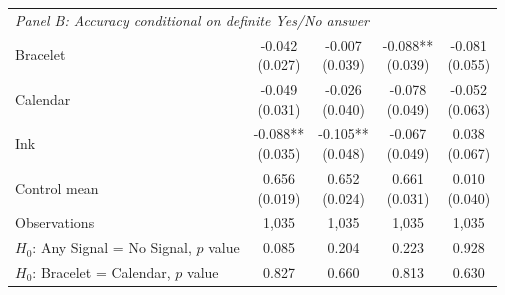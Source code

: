 {\begin{tabular}[t]{lcccc}
\multicolumn{5}{l}{\textit{Panel B: Accuracy conditional on definite Yes/No answer}} \\
Bracelet & \makecell[c]{-0.042\\{(0.027)}} & \makecell[c]{-0.007\\{(0.039)}} & \makecell[c]{-0.088**\\{(0.039)}} & \makecell[c]{-0.081\\{(0.055)}}\\
Calendar & \makecell[c]{-0.049\\{(0.031)}} & \makecell[c]{-0.026\\{(0.040)}} & \makecell[c]{-0.078\\{(0.049)}} & \makecell[c]{-0.052\\{(0.063)}}\\
Ink & \makecell[c]{-0.088**\\{(0.035)}} & \makecell[c]{-0.105**\\{(0.048)}} & \makecell[c]{-0.067\\{(0.049)}} & \makecell[c]{0.038\\{(0.067)}}\\
\midrule
Control mean & \makecell[c]{0.656\\{(0.019)}} & \makecell[c]{0.652\\{(0.024)}} & \makecell[c]{0.661\\{(0.031)}} & \makecell[c]{0.010\\{(0.040)}}\\
Observations & 1{,}035 & 1{,}035 & 1{,}035 & 1{,}035\\
\(H_0\): Any Signal = No Signal, \(p\) value & 0.085 & 0.204 & 0.223 & 0.928\\
\(H_0\): Bracelet = Calendar, \(p\) value & 0.827 & 0.660 & 0.813 & 0.630\\
\midrule


\end{tabular}}
